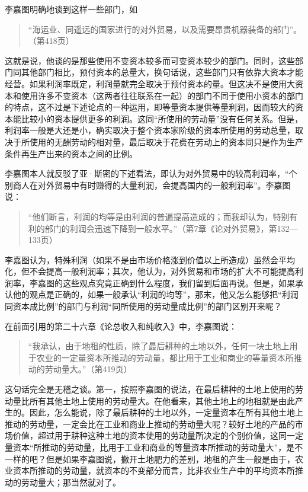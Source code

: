 李嘉图明确地谈到这样一些部门，如

\begin{quote}{“海运业、同遥远的国家进行的对外贸易，以及需要昂贵机器装备的部门”。（第418页）}\end{quote}

这就是说，他谈的是那些使用不变资本较多而可变资本较少的部门。同时，这些部门同其他部门相比，预付资本的总量大，换句话说，这些部门只有依靠大资本才能经营。如果利润率既定，利润量就完全取决于预付资本的量。但这决不是使用大资本和使用许多不变资本（这两者往往联系在一起）的部门不同于使用小资本的部门的特点，这不过是下述论点的一种运用，即等量资本提供等量利润，因而较大的资本能比较小的资本提供更多的利润。这同“所使用的劳动量”没有任何关系。但是，利润率一般是大还是小，确实取决于整个资本家阶级的资本所使用的劳动总量，取决于所使用的无酬劳动的相对量，最后取决于花费在劳动上的资本同只是作为生产条件再生产出来的资本之间的比例。

李嘉图本人就反驳了亚·斯密的下述看法，即认为对外贸易中的较高利润率，“个别商人在对外贸易中有时赚得的大量利润，会提高国内的一般利润率”。李嘉图说：

\begin{quote}{“他们断言，利润的均等是由利润的普遍提高造成的；而我却认为，特别有利的部门的利润会迅速下降到一般水平。”（第7章《论对外贸易》，第132—133页）}\end{quote}

李嘉图认为，特殊利润（如果不是由市场价格涨到价值以上所造成）虽然会平均化，但不会提高一般利润率；其次，他认为，对外贸易和市场的扩大不可能提高利润率，李嘉图的这些观点究竟正确到什么程度，我们留到后面再说。但是，如果承认他的观点是正确的，如果一般承认“利润的均等”，那末，他又怎么能够把“利润同资本成比例”的部门与利润“同所使用的劳动量成比例”的部门区别开来呢？

在前面引用的第二十六章《论总收入和纯收入》中，李嘉图说：

\begin{quote}{“我承认，由于地租的性质，除了最后耕种的土地以外，任何一块土地上用于农业的一定量资本所推动的劳动量，都比用于工业和商业的等量资本所推动的劳动量大。”（第419页）}\end{quote}

这句话完全是无稽之谈。第一，按照李嘉图的说法，在最后耕种的土地上使用的劳动量比所有其他土地上使用的劳动量大。在他看来，其他土地上的地租就是由此产生的。因此，怎么能说，除了最后耕种的土地以外，一定量资本在所有其他土地上推动的劳动量，一定会比在工业和商业上推动的劳动量大呢？较好土地的产品的市场价值，超过用于耕种这种土地的资本使用的劳动量所决定的个别价值，这同一定量资本“所推动的劳动量，比用于工业和商业的等量资本所推动的劳动量大”，是不一样的吧？但是如果李嘉图说，撇开土地肥力的差别，地租的产生一般是由于，农业资本所推动的劳动量，就资本的不变部分而言，比非农业生产中的平均资本所推动的劳动量大；那当然就对了。


